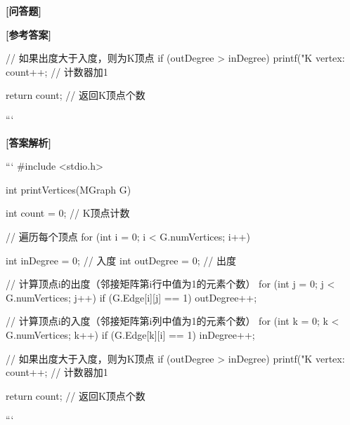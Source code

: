 \documentclass[12pt,a4paper]{article}
\newenvironment{choicequestion}[1][]{%
    \vspace{0.5cm}
    \noindent\textbf{[#1]}
    \vspace{0.2cm}
}{}
\newenvironment{answersection}{%
    \vspace{0.2cm}
    \noindent\textbf{[参考答案]}\\
    \vspace{0.1cm}
}{}
\newenvironment{analysissection}{%
    \vspace{0.2cm}
    \noindent\textbf{[答案解析]}\\
    \vspace{0.1cm}
}{}
\begin{document}
\begin{choicequestion}[问答题]
\begin{answersection}
{{        // 如果出度大于入度，则为K顶点
        if (outDegree > inDegree) {
            printf("K vertex: %
            count++;  // 计数器加1
        }
    }
    
    return count;  // 返回K顶点个数
}
```


\end{answersection}

\begin{analysissection}
```
#include <stdio.h>

int printVertices(MGraph G) {
    int count = 0;  // K顶点计数
    
    // 遍历每个顶点
    for (int i = 0; i < G.numVertices; i++) {
        int inDegree = 0;    // 入度
        int outDegree = 0;   // 出度
        
        // 计算顶点i的出度（邻接矩阵第i行中值为1的元素个数）
        for (int j = 0; j < G.numVertices; j++) {
            if (G.Edge[i][j] == 1) {
                outDegree++;
            }
        }
        
        // 计算顶点i的入度（邻接矩阵第i列中值为1的元素个数）
        for (int k = 0; k < G.numVertices; k++) {
            if (G.Edge[k][i] == 1) {
                inDegree++;
            }
        }
        
        // 如果出度大于入度，则为K顶点
        if (outDegree > inDegree) {
            printf("K vertex: %
            count++;  // 计数器加1
        }
    }
    
    return count;  // 返回K顶点个数
}
```


\end{answersection}
\end{choicequestion}
\end{document}
